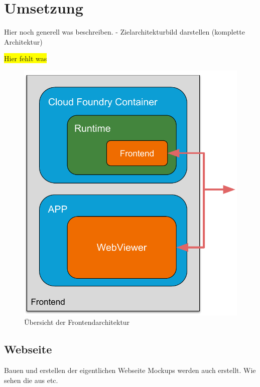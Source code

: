 \section{Umsetzung}
Hier noch generell was beschreiben. - Zielarchitekturbild darstellen (komplette Architektur)

\colorbox{yellow}{Hier fehlt was}

\begin{figure}[h]
    \centering
    \includegraphics[scale=0.5]{images/kapitel_4/architektur_frontend.pdf}
    \caption{Übersicht der Frontendarchitektur}
    \label{fig:umsetzung_frontendarchitektur_4}
\end{figure}

\subsection{Webseite}
\label{subsec:webseite}
Bauen und erstellen der eigentlichen Webseite
Mockups werden auch erstellt. Wie sehen die aus etc.

